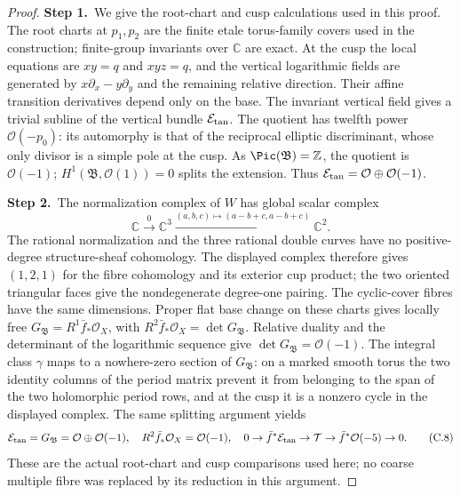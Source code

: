 \begin{proof}
\par\smallskip\noindent\textbf{Step 1.}\ We give the root-chart and cusp calculations used in this proof. The root charts at $p_1,p_2$ are the finite etale torus-family covers used in the construction; finite-group invariants over $\mathbb C$ are exact. At the cusp the local equations are $xy=q$ and $xyz=q$, and the vertical logarithmic fields are generated by $x\partial_x-y\partial_y$ and the remaining relative direction. Their affine transition derivatives depend only on the base. The invariant vertical field gives a trivial subline of the vertical bundle $\mathcal E_{\rm tan}$. The quotient has twelfth power $\mathcal O(-p_0)$: its automorphy is that of the reciprocal elliptic discriminant, whose only divisor is a simple pole at the cusp. As $\Pic(\mathfrak B)=\mathbb Z$, the quotient is $\mathcal O(-1)$; $H^1(\mathfrak B,\mathcal O(1))=0$ splits the extension. Thus $\mathcal E_{\rm tan}=\mathcal O\oplus\mathcal O(-1)$.

\par\smallskip\noindent\textbf{Step 2.}\ The normalization complex of $W$ has global scalar complex
\[
 \mathbb C\xrightarrow{0}\mathbb C^3
 \xrightarrow{(a,b,c)\mapsto(a-b+c,a-b+c)}\mathbb C^2.
\]
The rational normalization and the three rational double curves have no positive-degree structure-sheaf cohomology. The displayed complex therefore gives $(1,2,1)$ for the fibre cohomology and its exterior cup product; the two oriented triangular faces give the nondegenerate degree-one pairing. The cyclic-cover fibres have the same dimensions. Proper flat base change on these charts gives locally free $G_{\mathfrak B}=R^1\bar f_*\mathcal O_X$, with $R^2\bar f_*\mathcal O_X=\det G_{\mathfrak B}$. Relative duality and the determinant of the logarithmic sequence give $\det G_{\mathfrak B}=\mathcal O(-1)$. The integral class $\gamma$ maps to a nowhere-zero section of $G_{\mathfrak B}$: on a marked smooth torus the two identity columns of the period matrix prevent it from belonging to the span of the two holomorphic period rows, and at the cusp it is a nonzero cycle in the displayed complex. The same splitting argument yields
\[
\mathcal E_{\rm tan}=G_{\mathfrak B}=\mathcal O\oplus\mathcal O(-1),\quad R^2\bar f_*\mathcal O_X=\mathcal O(-1),
\quad0\to\bar f^*\mathcal E_{\rm tan}\to\mathcal T\to\bar f^*\mathcal O(-5)\to0. \tag{C.8}
\]
These are the actual root-chart and cusp comparisons used here; no coarse multiple fibre was replaced by its reduction in this argument.


\end{proof}
